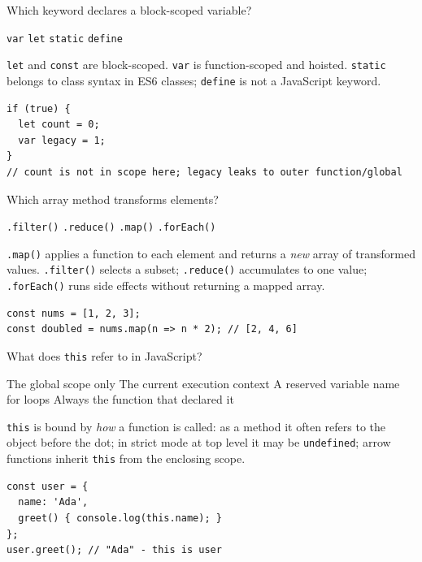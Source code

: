 \question[4]
Which keyword declares a block-scoped variable?
\begin{choices}
  \choice \lstinline[style=jsinline]|var|
  \CorrectChoice \lstinline[style=jsinline]|let|
  \choice \lstinline[style=jsinline]|static|
  \choice \lstinline[style=jsinline]|define|
\end{choices}
\begin{solution}
  \lstinline[style=jsinline]|let| and \lstinline[style=jsinline]|const| are block-scoped. \lstinline[style=jsinline]|var| is function-scoped and hoisted. \lstinline[style=jsinline]|static| belongs to class syntax in ES6 classes; \lstinline[style=jsinline]|define| is not a JavaScript keyword.
\begin{lstlisting}[style=js]
if (true) {
  let count = 0;
  var legacy = 1;
}
// count is not in scope here; legacy leaks to outer function/global
\end{lstlisting}
\end{solution}

\question[4]
Which array method transforms elements?
\begin{choices}
  \choice \lstinline[style=jsinline]|.filter()|
  \choice \lstinline[style=jsinline]|.reduce()|
  \CorrectChoice \lstinline[style=jsinline]|.map()|
  \choice \lstinline[style=jsinline]|.forEach()|
\end{choices}
\begin{solution}
  \lstinline[style=jsinline]|.map()| applies a function to each element and returns a \emph{new} array of transformed values. \lstinline[style=jsinline]|.filter()| selects a subset; \lstinline[style=jsinline]|.reduce()| accumulates to one value; \lstinline[style=jsinline]|.forEach()| runs side effects without returning a mapped array.
\begin{lstlisting}[style=js]
const nums = [1, 2, 3];
const doubled = nums.map(n => n * 2); // [2, 4, 6]
\end{lstlisting}
\end{solution}



\newpage



\question[4]
What does \lstinline[style=jsinline]|this| refer to in JavaScript?
\begin{choices}
  \choice The global scope only
  \CorrectChoice The current execution context
  \choice A reserved variable name for loops
  \choice Always the function that declared it
\end{choices}
\begin{solution}
  \lstinline[style=jsinline]|this| is bound by \emph{how} a function is called: as a method it often refers to the object before the dot; in strict mode at top level it may be \lstinline[style=jsinline]|undefined|; arrow functions inherit \lstinline[style=jsinline]|this| from the enclosing scope.
\begin{lstlisting}[style=js]
const user = {
  name: 'Ada',
  greet() { console.log(this.name); }
};
user.greet(); // "Ada" - this is user
\end{lstlisting}
\end{solution}

